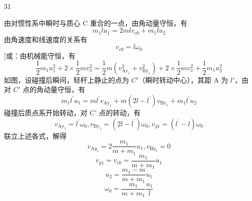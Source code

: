 \begin{solution}{31}
\begin{subsolution}
\begin{subproblem}[碰撞过程]
\begin{equation}
        \label{eq:5.p31}
      \end{equation}
      由对惯性系中瞬时与质心 C 重合的一点，由角动量守恒，有
      \begin{equation}
        m_{1} l u_{1} = 2 m l v_{c 0} + m_{1} l u_{2}
        \label{eq:6.p31}
      \end{equation}
      由角速度和线速度的关系有
      \begin{equation}
        v_{c 0} = l \omega_{0}
      \end{equation}
      [或：由机械能守恒，有
      \begin{equation}
        \frac{1}{2} m_{1} u_{1}^{2} + 2 \times \frac{1}{2} m v_{x}^{2} = \frac{1}{2} m (v_{\mathrm{Ay}_{1}}^{2} + v_{\mathrm{By}_{1}}^{2}) + 2 \times \frac{1}{2} m v_{x}^{2} + \frac{1}{2} m_{1} u_{2}^{2}
        \label{eq:7.p31}
      \end{equation}
      如图，设碰撞后瞬间，轻杆上静止的点为 $C'$（瞬时转动中心），其距 A 为 $l'$，由对 $C'$ 点的角动量守恒，有
      \begin{equation}
        m_{1} l^{\prime} u_{1} = m l^{\prime} v_{\mathrm{Ay}_{1}} + m (2 l - l^{\prime}) v_{\mathrm{By}_{1}} + m_{1} l^{\prime} u_{2}
        \label{eq:8.p31}
      \end{equation}
      碰撞后质点系开始转动，对 C' 点的转动，有
      \begin{equation}
        v_{\mathrm{Ay}_{1}} = l^{\prime} \omega_{0}, v_{\mathrm{By}_{1}} = (2 l - l^{\prime}) \omega_{0}, v_{y 1} = (l^{\prime} - l) \omega_{0}
      \end{equation}
      联立上述各式，解得
      \begin{equation}
        v_{\mathrm{A} y_{1}} = 2 \frac{m_{1}}{m + m_{1}} u_{1}, v_{\mathrm{B} y_{1}} = 0
        \label{eq:9.p31}
      \end{equation}
      \begin{equation}
        v_{y 1} = v_{c 0} = \frac{m_{1}}{m + m_{1}} u_{1}
        \label{eq:10.p31}
      \end{equation}
      \begin{equation}
        u_{2} = \frac{m_{1} - m}{m + m_{1}} u_{1}
        \label{eq:11.p31}
      \end{equation}
      \begin{equation}
        \omega_{0} = \frac{m_{1}}{m + m_{1}} \frac{u_{1}}{l}
        \label{eq:12.p31}
      \end{equation}
    \end{subproblem}
    \begin{subproblem}

\end{subproblem}
\end{subsolution}
\end{solution}
